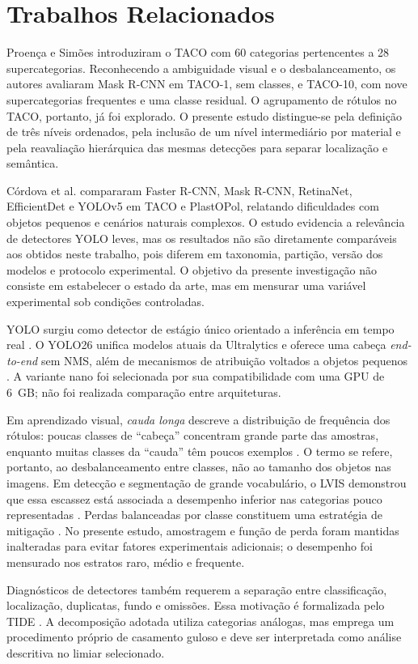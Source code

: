 \section{Trabalhos Relacionados}

Proença e Simões \cite{proenca2020taco} introduziram o TACO com 60 categorias pertencentes a 28 supercategorias. Reconhecendo a ambiguidade visual e o desbalanceamento, os autores avaliaram Mask R-CNN em TACO-1, sem classes, e TACO-10, com nove supercategorias frequentes e uma classe residual. O agrupamento de rótulos no TACO, portanto, já foi explorado. O presente estudo distingue-se pela definição de três níveis ordenados, pela inclusão de um nível intermediário por material e pela reavaliação hierárquica das mesmas detecções para separar localização e semântica.

Córdova et al. \cite{cordova2022litter} compararam Faster R-CNN, Mask R-CNN, RetinaNet, EfficientDet e YOLOv5 em TACO e PlastOPol, relatando dificuldades com objetos pequenos e cenários naturais complexos. O estudo evidencia a relevância de detectores YOLO leves, mas os resultados não são diretamente comparáveis aos obtidos neste trabalho, pois diferem em taxonomia, partição, versão dos modelos e protocolo experimental. O objetivo da presente investigação não consiste em estabelecer o estado da arte, mas em mensurar uma variável experimental sob condições controladas.

YOLO surgiu como detector de estágio único orientado a inferência em tempo real \cite{redmon2016yolo}. O YOLO26 unifica modelos atuais da Ultralytics e oferece uma cabeça \textit{end-to-end} sem NMS, além de mecanismos de atribuição voltados a objetos pequenos \cite{jocher2026yolo26}. A variante nano foi selecionada por sua compatibilidade com uma GPU de 6~GB; não foi realizada comparação entre arquiteturas.

Em aprendizado visual, \emph{cauda longa} descreve a distribuição de frequência dos rótulos: poucas classes de ``cabeça'' concentram grande parte das amostras, enquanto muitas classes da ``cauda'' têm poucos exemplos \cite{cui2019classbalanced}. O termo se refere, portanto, ao desbalanceamento entre classes, não ao tamanho dos objetos nas imagens. Em detecção e segmentação de grande vocabulário, o LVIS demonstrou que essa escassez está associada a desempenho inferior nas categorias pouco representadas \cite{gupta2019lvis}. Perdas balanceadas por classe constituem uma estratégia de mitigação \cite{cui2019classbalanced}. No presente estudo, amostragem e função de perda foram mantidas inalteradas para evitar fatores experimentais adicionais; o desempenho foi mensurado nos estratos raro, médio e frequente.

Diagnósticos de detectores também requerem a separação entre classificação, localização, duplicatas, fundo e omissões. Essa motivação é formalizada pelo TIDE \cite{bolya2020tide}. A decomposição adotada utiliza categorias análogas, mas emprega um procedimento próprio de casamento guloso e deve ser interpretada como análise descritiva no limiar selecionado.

